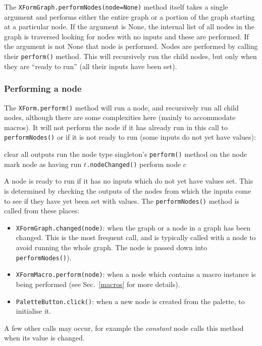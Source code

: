 The \texttt{XFormGraph.performNodes(node=None)} method itself takes a single
argument and performs either the entire graph or a portion of the graph
starting at a particular node. If the argument is None, the internal list of
all nodes in the graph is traversed looking for nodes with no inputs and these
are performed. If the argument is not None that node is performed. Nodes are
performed by calling their \texttt{perform()} method. This will recursively
run the child nodes, but only when they are ``ready to run'' (all their inputs
have been set). 

\subsubsection{Performing a node}
The \texttt{XForm.perform()} method will run a node, and recursively run all child nodes, although
there are some complexities here (mainly to accommodate macros). It will not perform the node if it 
has already run in this call to \texttt{performNodes()} or if it is not ready to run (some inputs do not yet have values):
\begin{algorithmic}
\STATE clear all outputs
\STATE run the node type singleton's \texttt{perform()} method on the node
\STATE mark node as having run
\STATE $t$\texttt{.nodeChanged()}
\ENDFOR
{}
\STATE perform node $c$
\ENDFOR
\ENDIF
\end{algorithmic}
A node is ready to run if it has no inputs which do not yet have values set. This is
determined by checking the outputs of the nodes from which the inputs come to see if
they have yet been set with values. The \texttt{performNodes()} method is called from these places:
\begin{itemize}
\item \texttt{XFormGraph.changed(node)}: when the graph or a node in a graph has been changed. This is the most
frequent call, and is typically called with a node to avoid running the whole graph. The node is passed down into
\texttt{performNodes()}).
\item \texttt{XFormMacro.perform(node)}: when a node which contains a macro instance is being performed (see
Sec.~\ref{macros} for more details).
\item \texttt{PaletteButton.click()}: when a new node is created from the palette, to initialise it.
\end{itemize}
A few other calls may occur, for example the \emph{constant} node calls this method when its value is changed.
